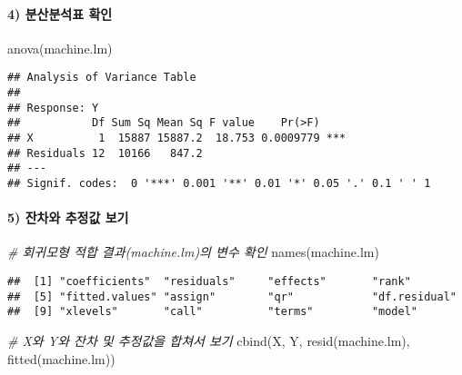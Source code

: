 \documentclass[
]{article}
\newenvironment{Shaded}{\begin{snugshade}}{\end{snugshade}}
\newcommand{\CommentTok}[1]{\textcolor[rgb]{0.56,0.35,0.01}{\textit{#1}}}
\newcommand{\FunctionTok}[1]{\textcolor[rgb]{0.00,0.00,0.00}{#1}}
\newcommand{\NormalTok}[1]{#1}
\begin{document}
\hypertarget{uxbd84uxc0b0uxbd84uxc11duxd45c-uxd655uxc778}{%
\paragraph{4) 분산분석표
확인}\label{uxbd84uxc0b0uxbd84uxc11duxd45c-uxd655uxc778}}

\begin{Shaded}
\begin{Highlighting}[]
\FunctionTok{anova}\NormalTok{(machine.lm)}
\end{Highlighting}
\end{Shaded}

\begin{verbatim}
## Analysis of Variance Table
## 
## Response: Y
##           Df Sum Sq Mean Sq F value    Pr(>F)    
## X          1  15887 15887.2  18.753 0.0009779 ***
## Residuals 12  10166   847.2                      
## ---
## Signif. codes:  0 '***' 0.001 '**' 0.01 '*' 0.05 '.' 0.1 ' ' 1
\end{verbatim}

\hypertarget{uxc794uxcc28uxc640-uxcd94uxc815uxac12-uxbcf4uxae30}{%
\paragraph{5) 잔차와 추정값
보기}\label{uxc794uxcc28uxc640-uxcd94uxc815uxac12-uxbcf4uxae30}}

\begin{Shaded}
\begin{Highlighting}[]
\CommentTok{\# 회귀모형 적합 결과(machine.lm)의 변수 확인}
\FunctionTok{names}\NormalTok{(machine.lm)}
\end{Highlighting}
\end{Shaded}

\begin{verbatim}
##  [1] "coefficients"  "residuals"     "effects"       "rank"         
##  [5] "fitted.values" "assign"        "qr"            "df.residual"  
##  [9] "xlevels"       "call"          "terms"         "model"
\end{verbatim}

\begin{Shaded}
\begin{Highlighting}[]
\CommentTok{\# X와 Y와 잔차 및 추정값을 합쳐서 보기}
\FunctionTok{cbind}\NormalTok{(X, Y, }\FunctionTok{resid}\NormalTok{(machine.lm), }\FunctionTok{fitted}\NormalTok{(machine.lm))}
\end{Highlighting}
\end{Shaded}
\end{document}
